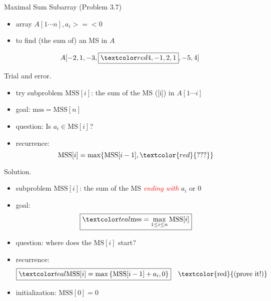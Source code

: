 
\begin{frame}{}
  \begin{exampleblock}{Maximal Sum Subarray (Problem $3.7$)}
    \begin{itemize}
      \item array $A[1 \cdots n], a_{i} >=< 0$
      \item to find (the sum of) an MS in $A$
    \end{itemize}
	
    \[
      A[-2,1 ,-3, \boxed{\red{4,-1,2,1}} ,-5,4]
    \]
  \end{exampleblock}

  \pause
  \vspace{0.30cm}
  \begin{alertblock}{Trial and error.}
    \begin{itemize}
      \item try subproblem $\text{MSS}[i]$: the sum of the MS ([i]) in $A[1 \cdots i]$
      \item goal: $\text{mss} = \text{MSS}[n]$
	\pause
      \item question: Is $a_{i} \in \text{MS}[i]$?
      \item recurrence: 
	\[ 
	  \text{MSS}[i] = \max \set{\text{MSS}[i-1], \textcolor{red}{???}}
	\]
    \end{itemize}
  \end{alertblock}
\end{frame}
\begin{frame}{}
  \begin{block}{Solution.}
    \begin{itemize}
      \item subproblem $\text{MSS}[i]$: the sum of the MS \textcolor{red}{\it ending with} $a_{i}$ or 0
      \item goal: 
	\[
	  \boxed{\teal{\text{mss} = \max\limits_{1 \le i \le n} \text{MSS}[i]}}
	\]
      \item<2-> question: where does the $\text{MS}[i]$ start?
      \item<2-> recurrence: 
	\[ 
	  \boxed{\teal{\text{MSS}[i] = \max \left\{\text{MSS}[i-1] + a_{i}, 0\right\}}} \quad \text{\textcolor{red}{(prove it!)}}
	\]
      \item<3-> initialization: $\text{MSS}[0] = 0$
    \end{itemize}

  \end{block}
\end{frame}
\begin{frame}{}
  

  \pause
  \vspace{-0.30cm}
  
\end{frame}
